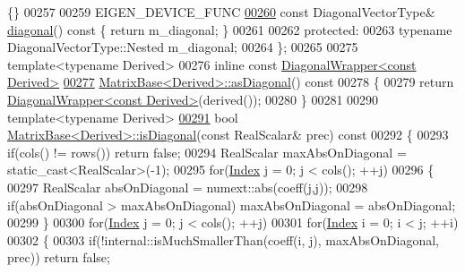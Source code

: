 \begin{DoxyCode}
       \{\}
00257 
00259     EIGEN\_DEVICE\_FUNC
\hyperlink{group___core___module_a8e84e44aa74ab66f54ffb45e439ef0d5}{00260}     \textcolor{keyword}{const} DiagonalVectorType& \hyperlink{group___core___module_a8e84e44aa74ab66f54ffb45e439ef0d5}{diagonal}()\textcolor{keyword}{ const }\{ \textcolor{keywordflow}{return} m\_diagonal; \}
00261 
00262   \textcolor{keyword}{protected}:
00263     \textcolor{keyword}{typename} DiagonalVectorType::Nested m\_diagonal;
00264 \};
00265 
00275 \textcolor{keyword}{template}<\textcolor{keyword}{typename} Derived>
00276 \textcolor{keyword}{inline} \textcolor{keyword}{const} \hyperlink{group___core___module_class_eigen_1_1_diagonal_wrapper}{DiagonalWrapper<const Derived>}
\hyperlink{group___core___module_a14235b62c90f93fe910070b4743782d0}{00277} \hyperlink{group___core___module_a14235b62c90f93fe910070b4743782d0}{MatrixBase<Derived>::asDiagonal}()\textcolor{keyword}{ const}
00278 \textcolor{keyword}{}\{
00279   \textcolor{keywordflow}{return} \hyperlink{group___core___module_class_eigen_1_1_diagonal_wrapper}{DiagonalWrapper<const Derived>}(derived());
00280 \}
00281 
00290 \textcolor{keyword}{template}<\textcolor{keyword}{typename} Derived>
\hyperlink{group___core___module_a97027ea54c8cd1ddb1c578fee5cedc67}{00291} \textcolor{keywordtype}{bool} \hyperlink{group___core___module_a97027ea54c8cd1ddb1c578fee5cedc67}{MatrixBase<Derived>::isDiagonal}(\textcolor{keyword}{const} RealScalar& prec)\textcolor{keyword}{ const}
00292 \textcolor{keyword}{}\{
00293   \textcolor{keywordflow}{if}(cols() != rows()) \textcolor{keywordflow}{return} \textcolor{keyword}{false};
00294   RealScalar maxAbsOnDiagonal = \textcolor{keyword}{static\_cast<}RealScalar\textcolor{keyword}{>}(-1);
00295   \textcolor{keywordflow}{for}(\hyperlink{namespace_eigen_a62e77e0933482dafde8fe197d9a2cfde}{Index} j = 0; j < cols(); ++j)
00296   \{
00297     RealScalar absOnDiagonal = numext::abs(coeff(j,j));
00298     \textcolor{keywordflow}{if}(absOnDiagonal > maxAbsOnDiagonal) maxAbsOnDiagonal = absOnDiagonal;
00299   \}
00300   \textcolor{keywordflow}{for}(\hyperlink{namespace_eigen_a62e77e0933482dafde8fe197d9a2cfde}{Index} j = 0; j < cols(); ++j)
00301     \textcolor{keywordflow}{for}(\hyperlink{namespace_eigen_a62e77e0933482dafde8fe197d9a2cfde}{Index} i = 0; i < j; ++i)
00302     \{
00303       \textcolor{keywordflow}{if}(!internal::isMuchSmallerThan(coeff(i, j), maxAbsOnDiagonal, prec)) \textcolor{keywordflow}{return} \textcolor{keyword}{false};

\end{DoxyCode}
